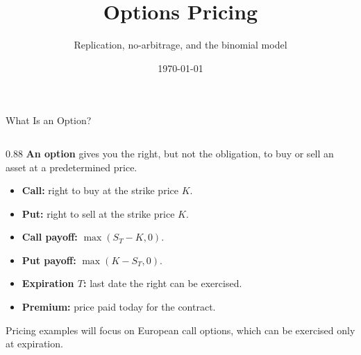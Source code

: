 \documentclass[aspectratio=169,10pt]{beamer}
\title{Options Pricing}
\subtitle{Replication, no-arbitrage, and the binomial model}
\author{}
\institute{}
\date{\today}
\begin{document}
\begin{frame}{What Is an Option?}
  \begin{columns}[T,onlytextwidth]
    \begin{column}{0.88\textwidth}
      \textbf{An option} gives you the \alert{right, but not the obligation}, to buy or sell an asset at a predetermined price.
      \vspace{0.35cm}
      \begin{itemize}
         \item \textbf{Call:} right to buy at the strike price $K$.
         \item \textbf{Put:} right to sell at the strike price $K$.
         \item \textbf{Call payoff:} $\max(S_T-K,0)$.
         \item \textbf{Put payoff:} $\max(K-S_T,0)$.
         \item \textbf{Expiration $T$:} last date the right can be exercised.
        \item \textbf{Premium:} price paid today for the contract.
      \end{itemize}
      \scriptsize Pricing examples will focus on European call options, which can be exercised only at expiration.
    \end{column}
  \end{columns}
\end{frame}
\end{document}
